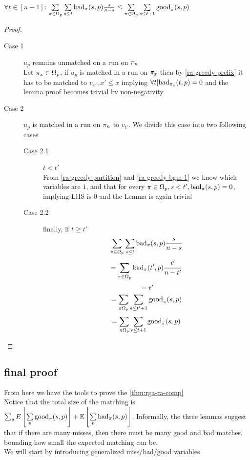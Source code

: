 \begin{lemma}
	\label{ra-greedy-bgm-3}
	$\forall t\in[n-1]$:
	$\sum\limits_{\pi\in\Omega_p}\sum\limits_{s\leq t}\mathrm{bad}_\pi(s,p)\frac{s}{n-s}\leq \sum\limits_{\pi\in\Omega_p}\sum\limits_{s\leq t+1}\mathrm{good}_\pi(s,p)$
\end{lemma}
\begin{proof}
	\begin{description}
		\item[Case 1] $u_p$ remains unmatched on a run on $\pi_n$\\
		Let $\pi_x\in \Omega_p$, if $u_p$ is matched in a run on $\pi_x$ then by \autoref{ra-greedy-prefix} it has to be matched to $v_{x'},x'\leq x$ implying $\forall t | \mathrm{bad}_{\pi_x}(t,p)=0$ and the lemma proof becomes trivial by non-negativity
		\item[Case 2] $u_p$ is matched in a run on $\pi_n$ to $v_{t'}$. We divide this case into two following cases
		\begin{description}
			\item[Case 2.1] $t<t'$\\
				From \autoref{ra-greedy-partition} and \autoref{ra-greedy-bgm-1} we know which variables are $1$, and that for every $\pi\in\Omega_p,s<t', \mathrm{bad}_\pi(s,p)=0$, implying LHS is $0$ and the Lemma is again trivial
			\item[Case 2.2] finally, if $t\geq t'$
			\[\sum\limits_{\pi\in\Omega_p}\sum\limits_{s\leq t}\mathrm{bad}_\pi(s,p)\frac{s}{n-s}\]
			\[=\sum\limits_{\pi\in\Omega_p}\mathrm{bad}_\pi(t',p)\frac{t'}{n-t'}\]
			\[=t'\]
			\[=\sum\limits_{\pi\Omega_p}\sum\limits_{s\leq t'+1}\mathrm{good}_\pi(s,p)\]
			\[=\sum\limits_{\pi\Omega_p}\sum\limits_{s\leq t+1}\mathrm{good}_\pi(s,p)\]
		\end{description}
	\end{description}
\end{proof}

\subsection{final proof}

From here we have the tools to prove the \autoref{thm:rga-ra-comp}\\
Notice that the total size of the matching is $\sum_s E\left[\sum\limits_{p}\mathrm{good}_\pi(s,p)\right]+\mathbb{E}\left[\sum\limits_{p}\mathrm{bad}_\pi(s,p)\right]$. Informally, the three lemmas suggest that if there are many misses, then there must be many good and bad matches, bounding how small the expected matching can be.\\
We will start by introducing generalized miss/bad/good variables

